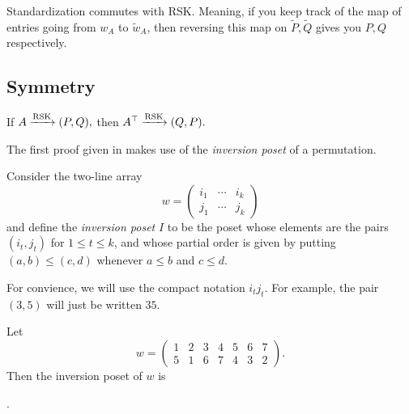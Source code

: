 \documentclass{article}
\DeclareMathOperator{\RSK}{RSK}
\newcommand{\rskarrow}{\ensuremath\xrightarrow{\RSK}}
\begin{document}
\begin{lemma}
    Standardization commutes with RSK.
    Meaning, if you keep track of the map of entries going from $w_A$ to $\widetilde{w}_A$, then reversing this map on $\widetilde{P},\widetilde{Q}$ gives you $P,Q$ respectively.
\end{lemma}

\subsection{Symmetry}

\begin{theorem}\label{thm:rsksymmetry}
    If $A \rskarrow (P,Q),$ then $A^\top \rskarrow (Q,P).$
\end{theorem}

The first proof given in \cite{Stanley} makes use of the \textit{inversion poset} of a permutation.

\begin{definition}
    Consider the two-line array
    \[
        w = \begin{pmatrix}
            i_1 & \cdots & i_k \\
            j_1 & \cdots & j_k
        \end{pmatrix}
    \]
    and define the \textit{inversion poset} $I$ to be the poset whose elements are the pairs $(i_t, j_t)$ for $1 \leq t \leq k$, and whose partial order is given by putting $(a,b) \leq (c,d)$ whenever $a \leq b$ and $c \leq d$.
\end{definition}

For convience, we will use the compact notation $i_tj_t$.
For example, the pair $(3,5)$ will just be written $35$.

\begin{example}\label{ex:invposet}
    Let
    \[
        w = \begin{pmatrix}
            1 & 2 & 3 & 4 & 5 & 6 & 7 \\
            5 & 1 & 6 & 7 & 4 & 3 & 2
        \end{pmatrix}.
    \]
    Then the inversion poset of $w$ is 
    \begin{center}
        .
    \end{center}
\end{example}
\end{document}
